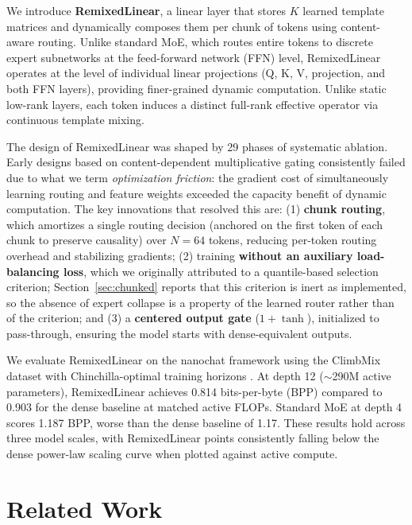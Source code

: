 \documentclass{article}
\begin{document}
We introduce \textbf{RemixedLinear}, a linear layer that stores $K$ learned template matrices and dynamically composes them per chunk of tokens using content-aware routing. Unlike standard MoE, which routes entire tokens to discrete expert subnetworks at the feed-forward network (FFN) level, RemixedLinear operates at the level of individual linear projections (Q, K, V, projection, and both FFN layers), providing finer-grained dynamic computation. Unlike static low-rank layers, each token induces a distinct full-rank effective operator via continuous template mixing.

The design of RemixedLinear was shaped by 29 phases of systematic ablation. Early designs based on content-dependent multiplicative gating consistently failed due to what we term \emph{optimization friction}: the gradient cost of simultaneously learning routing and feature weights exceeded the capacity benefit of dynamic computation. The key innovations that resolved this are: (1) \textbf{chunk routing}, which amortizes a single routing decision (anchored on the first token of each chunk to preserve causality) over $N{=}64$ tokens, reducing per-token routing overhead and stabilizing gradients; (2) training \textbf{without an auxiliary load-balancing loss}, which we originally attributed to a quantile-based selection criterion; Section~\ref{sec:chunked} reports that this criterion is inert as implemented, so the absence of expert collapse is a property of the learned router rather than of the criterion; and (3) a \textbf{centered output gate} ($1 + \tanh$), initialized to pass-through, ensuring the model starts with dense-equivalent outputs.

We evaluate RemixedLinear on the nanochat framework \citep{karpathy2025nanochat} using the ClimbMix dataset with Chinchilla-optimal training horizons \citep{hoffmann2022training}. At depth 12 ($\sim$290M active parameters), RemixedLinear achieves 0.814 bits-per-byte (BPP) compared to 0.903 for the dense baseline at matched active FLOPs. Standard MoE at depth 4 scores 1.187 BPP, worse than the dense baseline of 1.17. These results hold across three model scales, with RemixedLinear points consistently falling below the dense power-law scaling curve when plotted against active compute.

\section{Related Work}
\end{document}
